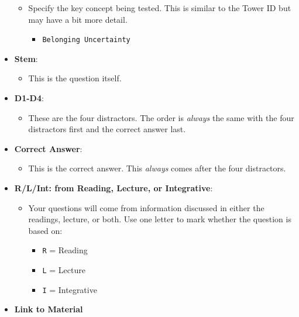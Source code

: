 \documentclass[
]{article}
\providecommand{\tightlist}{%
  \setlength{\itemsep}{0pt}\setlength{\parskip}{0pt}}
\begin{document}
\begin{itemize}
  \begin{itemize}
  \tightlist
  \item
    Specify the key concept being tested. This is similar to the Tower ID but may have a bit more detail.

    \begin{itemize}
    \tightlist
    \item
      \texttt{Belonging\ Uncertainty}
    \end{itemize}
  \end{itemize}
\item
  \textbf{Stem}:

  \begin{itemize}
  \tightlist
  \item
    This is the question itself.
  \end{itemize}
\item
  \textbf{D1-D4}:

  \begin{itemize}
  \tightlist
  \item
    These are the four distractors. The order is \emph{always} the same with the four distractors first and the correct answer last.
  \end{itemize}
\item
  \textbf{Correct Answer}:

  \begin{itemize}
  \tightlist
  \item
    This is the correct answer. This \emph{always} comes after the four distractors.
  \end{itemize}
\item
  \textbf{R/L/Int: from Reading, Lecture, or Integrative}:

  \begin{itemize}
  \tightlist
  \item
    Your questions will come from information discussed in either the readings, lecture, or both. Use one letter to mark whether the question is based on:

    \begin{itemize}
    \tightlist
    \item
      \texttt{R} = Reading
    \item
      \texttt{L} = Lecture\\
    \item
      \texttt{I} = Integrative
    \end{itemize}
  \end{itemize}
\item
  \textbf{Link to Material}


\end{itemize}
\end{document}
